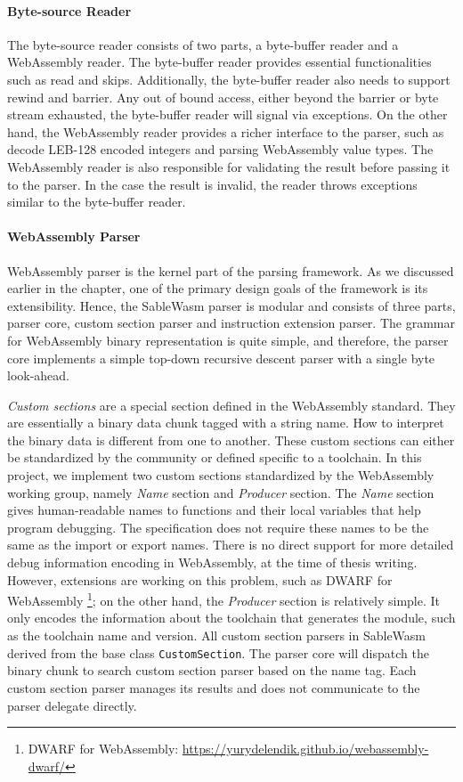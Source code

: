 \paragraph{Byte-source Reader}
The byte-source reader consists of two parts, a byte-buffer reader and a WebAssembly reader. The byte-buffer reader provides essential functionalities such as read and skips. Additionally, the byte-buffer reader also needs to support rewind and barrier. Any out of bound access, either beyond the barrier or byte stream exhausted, the byte-buffer reader will signal via exceptions. On the other hand, the WebAssembly reader provides a richer interface to the parser, such as decode LEB-128 encoded integers and parsing WebAssembly value types. The WebAssembly reader is also responsible for validating the result before passing it to the parser. In the case the result is invalid, the reader throws exceptions similar to the byte-buffer reader.

\paragraph{WebAssembly Parser}
WebAssembly parser is the kernel part of the parsing framework. As we discussed earlier in the chapter, one of the primary design goals of the framework is its extensibility. Hence, the SableWasm parser is modular and consists of three parts, parser core, custom section parser and instruction extension parser. The grammar for WebAssembly binary representation is quite simple, and therefore, the parser core implements a simple top-down recursive descent parser with a single byte look-ahead.

\emph{Custom sections} are a special section defined in the WebAssembly standard. They are essentially a binary data chunk tagged with a string name. How to interpret the binary data is different from one to another. These custom sections can either be standardized by the community or defined specific to a toolchain. In this project, we implement two custom sections standardized by the WebAssembly working group, namely \emph{Name} section and \emph{Producer} section. The \emph{Name} section gives human-readable names to functions and their local variables that help program debugging. The specification does not require these names to be the same as the import or export names. There is no direct support for more detailed debug information encoding in WebAssembly, at the time of thesis writing. However, extensions are working on this problem, such as DWARF for WebAssembly \footnote{DWARF for WebAssembly: \url{https://yurydelendik.github.io/webassembly-dwarf/}}; on the other hand, the \emph{Producer} section is relatively simple. It only encodes the information about the toolchain that generates the module, such as the toolchain name and version. All custom section parsers in SableWasm derived from the base class \texttt{CustomSection}. The parser core will dispatch the binary chunk to search custom section parser based on the name tag. Each custom section parser manages its results and does not communicate to the parser delegate directly.

